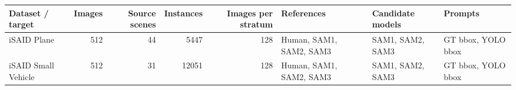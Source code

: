 \begin{tabular}{lrrrrlll}
\toprule
Dataset / target & Images & Source scenes & Instances & Images per stratum & References & Candidate models & Prompts \\
\midrule
iSAID Plane & 512 & 44 & 5447 & 128 & Human, SAM1, SAM2, SAM3 & SAM1, SAM2, SAM3 & GT bbox, YOLO bbox \\
iSAID Small Vehicle & 512 & 31 & 12051 & 128 & Human, SAM1, SAM2, SAM3 & SAM1, SAM2, SAM3 & GT bbox, YOLO bbox \\
\bottomrule
\end{tabular}
